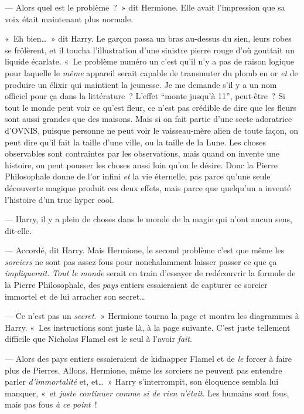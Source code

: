 --- Alors quel est le problème~?~» dit Hermione. Elle avait l'impression que sa voix était maintenant plus normale.

«~Eh bien…~» dit Harry. Le garçon passa un bras au-dessus du sien, leurs robes se frôlèrent, et il toucha l'illustration d'une sinistre pierre rouge d'où gouttait un liquide écarlate. «~Le problème numéro un c'est qu'il n'y a pas de raison logique pour laquelle le \emph{même} appareil serait capable de transmuter du plomb en or \emph{et} de produire un élixir qui maintient la jeunesse. Je me demande s'il y a un nom officiel pour ça dans la littérature~? L'effet “monte jusqu'à 11”, peut-être~? Si tout le monde peut voir ce qu'est fleur, ce n'est pas crédible de dire que les fleurs sont aussi grandes que des maisons. Mais si on fait partie d'une secte adoratrice d'OVNIS, puisque personne ne peut voir le vaisseau-mère alien de toute façon, on peut dire qu'il fait la taille d'une ville, ou la taille de la Lune. Les choses observables sont contraintes par les observations, mais quand on invente une histoire, on peut pousser les choses aussi loin qu'on le désire. Donc la Pierre Philosophale donne de l'or infini \emph{et} la vie éternelle, pas parce qu'une seule découverte magique produit ces deux effets, mais parce que quelqu'un a inventé l'histoire d'un truc hyper cool.

--- Harry, il y a plein de choses dans le monde de la magie qui n'ont aucun sens, dit-elle.

--- Accordé, dit Harry. Mais Hermione, le second problème c'est que même les \emph{sorciers} ne sont pas assez fous pour nonchalamment laisser passer ce que ça \emph{impliquerait}. \emph{Tout le monde} serait en train d'essayer de redécouvrir la formule de la Pierre Philosophale, des \emph{pays} entiers essaieraient de capturer ce sorcier immortel et de lui arracher son secret…

--- Ce n'est pas un \emph{secret}.~» Hermione tourna la page et montra les diagrammes à Harry. «~Les instructions sont juste là, à la page suivante. C'est juste tellement difficile que Nicholas Flamel est le seul à l'avoir \emph{fait}.

--- Alors des pays entiers essaieraient de kidnapper Flamel et de \emph{le} forcer à faire plus de Pierres. Allons, Hermione, même les sorciers ne peuvent pas entendre parler \emph{d'immortalité} et, et…~» Harry s'interrompit, son éloquence sembla lui manquer, «~et \emph{juste continuer comme si de rien n'était}. Les humains sont fous, mais pas fous \emph{à ce point}~!

